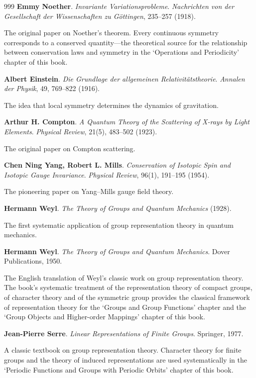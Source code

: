 \begin{thebibliography}{999}
 \textbf{Emmy Noether}. \textit{Invariante Variationsprobleme}. \textit{Nachrichten von der Gesellschaft der Wissenschaften zu G\"ottingen}, 235--257 (1918).

The original paper on Noether's theorem. Every continuous symmetry corresponds to a conserved quantity---the theoretical source for the relationship between conservation laws and symmetry in the `Operations and Periodicity' chapter of this book.

 \textbf{Albert Einstein}. \textit{Die Grundlage der allgemeinen Relativit\"atstheorie}. \textit{Annalen der Physik}, 49, 769--822 (1916).

The idea that local symmetry determines the dynamics of gravitation.

 \textbf{Arthur H. Compton}. \textit{A Quantum Theory of the Scattering of X-rays by Light Elements}. \textit{Physical Review}, 21(5), 483--502 (1923).

The original paper on Compton scattering.

 \textbf{Chen Ning Yang, Robert L. Mills}. \textit{Conservation of Isotopic Spin and Isotopic Gauge Invariance}. \textit{Physical Review}, 96(1), 191--195 (1954).

The pioneering paper on Yang--Mills gauge field theory.

 \textbf{Hermann Weyl}. \textit{The Theory of Groups and Quantum Mechanics} (1928).

The first systematic application of group representation theory in quantum mechanics.

 \textbf{Hermann Weyl}. \textit{The Theory of Groups and Quantum Mechanics}. Dover Publications, 1950.

The English translation of Weyl's classic work on group representation theory. The book's systematic treatment of the representation theory of compact groups, of character theory and of the symmetric group provides the classical framework of representation theory for the `Groups and Group Functions' chapter and the `Group Objects and Higher-order Mappings' chapter of this book.

 \textbf{Jean-Pierre Serre}. \textit{Linear Representations of Finite Groups}. Springer, 1977.

A classic textbook on group representation theory. Character theory for finite groups and the theory of induced representations are used systematically in the `Periodic Functions and Groups with Periodic Orbits' chapter of this book.


\end{thebibliography}
